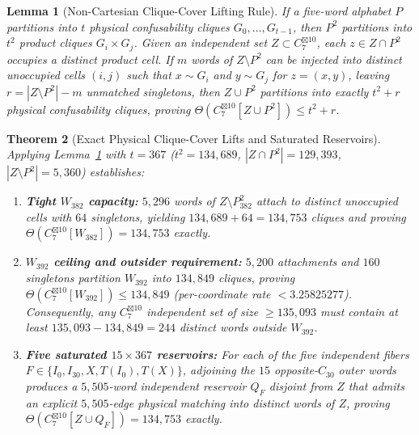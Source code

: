 \documentclass[11pt,letterpaper]{article}
\newtheorem{theorem}{Theorem}[section]
\newtheorem{lemma}[theorem]{Lemma}
\theoremstyle{definition}
\theoremstyle{remark}
\newcommand{\ThetaCap}{\Theta}
\begin{document}
\begin{lemma}[Non-Cartesian Clique-Cover Lifting Rule]\label{lem:lift}
If a five-word alphabet $P$ partitions into $t$ physical confusability cliques $G_0,\dots,G_{t-1}$, then $P^2$ partitions into $t^2$ product cliques $G_i \times G_j$. Given an independent set $Z \subset C_7^{\boxtimes 10}$, each $z \in Z \cap P^2$ occupies a distinct product cell. If $m$ words of $Z \setminus P^2$ can be injected into distinct unoccupied cells $(i,j)$ such that $x \sim G_i$ and $y \sim G_j$ for $z=(x,y)$, leaving $r = |Z \setminus P^2| - m$ unmatched singletons, then $Z \cup P^2$ partitions into exactly $t^2 + r$ physical confusability cliques, proving $\ThetaCap(C_7^{\boxtimes 10}[Z \cup P^2]) \le t^2 + r$.
\end{lemma}

\begin{theorem}[Exact Physical Clique-Cover Lifts and Saturated Reservoirs]\label{thm:c7-10}
Applying Lemma~\ref{lem:lift} with $t=367$ ($t^2 = 134{,}689$, $|Z \cap P^2|=129{,}393$, $|Z \setminus P^2|=5{,}360$) establishes:
\begin{enumerate}
  \item \textbf{Tight $W_{382}$ capacity:} $5{,}296$ words of $Z \setminus P_{382}^2$ attach to distinct unoccupied cells with $64$ singletons, yielding $134{,}689 + 64 = 134{,}753$ cliques and proving $\ThetaCap(C_7^{\boxtimes 10}[W_{382}]) = 134{,}753$ exactly.
  \item \textbf{$W_{392}$ ceiling and outsider requirement:} $5{,}200$ attachments and $160$ singletons partition $W_{392}$ into $134{,}849$ cliques, proving $\ThetaCap(C_7^{\boxtimes 10}[W_{392}]) \le 134{,}849$ (per-coordinate rate $< 3.25825277$). Consequently, any $C_7^{\boxtimes 10}$ independent set of size $\ge 135{,}093$ must contain at least $135{,}093 - 134{,}849 = 244$ distinct words outside $W_{392}$.
  \item \textbf{Five saturated $15 \times 367$ reservoirs:} For each of the five independent fibers $F \in \{I_0, I_{30}, X, T(I_0), T(X)\}$, adjoining the $15$ opposite-$C_{30}$ outer words produces a $5{,}505$-word independent reservoir $Q_F$ disjoint from $Z$ that admits an explicit $5{,}505$-edge physical matching into distinct words of $Z$, proving $\ThetaCap(C_7^{\boxtimes 10}[Z \cup Q_F]) = 134{,}753$ exactly.
\end{enumerate}
\end{theorem}
\end{document}
